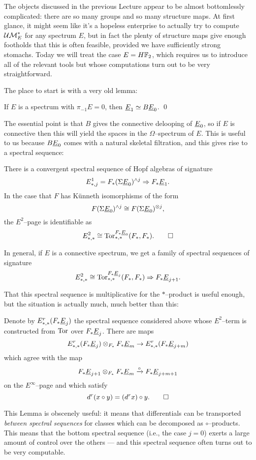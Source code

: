 The objects discussed in the previous Lecture appear to be almost bottomlessly complicated: there are so many groups and so many structure maps.  At first glance, it might seem like it's a hopeless enterprise to actually try to compute $\mathcal{UM}_{E}^*$ for any spectrum $E$, but in fact the plenty of structure maps give enough footholds that this is often feasible, provided we have sufficiently strong stomachs.  Today we will treat the case $E = H\mathbb F_2$, which requires us to introduce all of the relevant tools but whose computations turn out to be very straightforward.

The place to start is with a very old lemma:
\begin{lemma}
If $E$ is a spectrum with $\pi_{-1} E = 0$, then $\underline{\smash{E}}_{1} \simeq B\underline{\smash{E}}_{0}$. \qed
\end{lemma}
\noindent The essential point is that $B$ gives the connective delooping of $\underline{\smash{E}}_{0}$, so if $E$ is connective then this will yield the spaces in the $\Omega$--spectrum of $E$.  This is useful to us because $B\underline{\smash{E}}_{0}$ comes with a natural skeletal filtration, and this gives rise to a spectral sequence:
\begin{corollary}
There is a convergent spectral sequence of Hopf algebras of signature \[E^1_{*, j} = F_*(\Sigma \underline{\smash{E}}_{0})^{\wedge j} \Rightarrow F_* \underline{\smash{E}}_{1}.\]  In the case that $F$ has K\"unneth isomorphisms of the form \[F(\Sigma \underline{\smash{E}}_{0})^{\wedge j} \cong F(\Sigma \underline{\smash{E}}_{0})^{\otimes j},\] the $E^2$--page is identifiable as \[E^2_{*, *} \cong \operatorname{Tor}^{F_* \underline{\smash{E}}_{0}}_{*, *}(F_*, F_*). \qed\]
\end{corollary}
\noindent In general, if $E$ is a connective spectrum, we get a family of spectral sequences of signature \[E^2_{*, *} \cong \operatorname{Tor}^{F_* \underline{\smash{E}}_{j}}_{*, *}(F_*, F_*) \Rightarrow F_* \underline{\smash{E}}_{j+1}.\]

That this spectral sequence is multiplicative for the $\ast$--product is useful enough, but the situation is actually much, much better than this:
\begin{lemma}\label{CircProductAndDifferentials}
Denote by $E^r_{*, *}(F_* \underline{\smash{E}}_{j})$ the spectral sequence considered above whose $E^2$--term is constructed from $\operatorname{Tor}$ over $F_* \underline{\smash{E}}_{j}$.  There are maps \[E^r_{*, *}(F_* \underline{\smash{E}}_{j}) \otimes_{F_*} F_* \underline{\smash{E}}_{m} \to E^r_{*, *}(F_* \underline{\smash{E}}_{j+m})\] which agree with the map \[F_* \underline{\smash{E}}_{j+1} \otimes_{F_*} F_* \underline{\smash{E}}_{m} \xrightarrow{\circ} F_* \underline{\smash{E}}_{j+m+1}\] on the $E^\infty$--page and which satisfy \[d^r(x \circ y) = (d^r x) \circ y. \qed\]
\end{lemma}
\noindent This Lemma is obscenely useful: it means that differentials can be transported \emph{between spectral sequences} for classes which can be decomposed as $\circ$--products.  This means that the bottom spectral sequence (i.e., the case $j = 0$) exerts a large amount of control over the others --- and this spectral sequence often turns out to be very computable.

